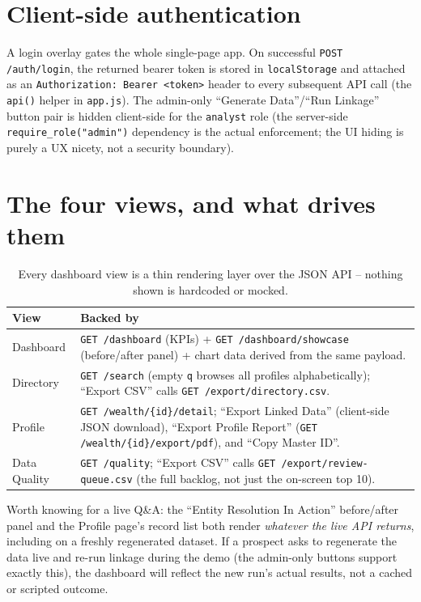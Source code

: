 \documentclass[11pt]{report}
\newcommand{\code}[1]{\lstinline[style=plain]!#1!}
\newcommand{\codeb}[1]{\texttt{\scriptsize #1}}
\begin{document}
\section{Client-side authentication}

A login overlay gates the whole single-page app. On successful \code{POST /auth/login}, the returned bearer token is stored in \code{localStorage} and attached as an \codeb{Authorization: Bearer <token>} header to every subsequent API call (the \code{api()} helper in \code{app.js}). The admin-only ``Generate Data''/``Run Linkage'' button pair is hidden client-side for the \code{analyst} role (the server-side \code{require_role("admin")} dependency is the actual enforcement; the UI hiding is purely a UX nicety, not a security boundary).

\section{The four views, and what drives them}

\begin{table}[h]
\centering
\small
\begin{tabular}{@{}lp{10cm}@{}}
\toprule
\textbf{View} & \textbf{Backed by} \\
\midrule
Dashboard & \texttt{GET /dashboard} (KPIs) + \texttt{GET /dashboard/showcase} (before/after panel) + chart data derived from the same payload. \\
Directory & \texttt{GET /search} (empty \texttt{q} browses all profiles alphabetically); ``Export CSV'' calls \texttt{GET /export/directory.csv}. \\
Profile & \texttt{GET /wealth/\{id\}/detail}; ``Export Linked Data'' (client-side JSON download), ``Export Profile Report'' (\texttt{GET /wealth/\{id\}/export/pdf}), and ``Copy Master ID''. \\
Data Quality & \texttt{GET /quality}; ``Export CSV'' calls \texttt{GET /export/review-queue.csv} (the full backlog, not just the on-screen top 10). \\
\bottomrule
\end{tabular}
\caption{Every dashboard view is a thin rendering layer over the JSON API -- nothing shown is hardcoded or mocked.}
\end{table}

\begin{engbox}
Worth knowing for a live Q\&A: the ``Entity Resolution In Action'' before/after panel and the Profile page's record list both render \emph{whatever the live API returns}, including on a freshly regenerated dataset. If a prospect asks to regenerate the data live and re-run linkage during the demo (the admin-only buttons support exactly this), the dashboard will reflect the new run's actual results, not a cached or scripted outcome.
\end{engbox}
\end{document}
